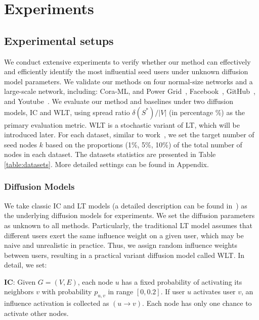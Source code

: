 \section{Experiments}
\label{sec:experiments}



\subsection{Experimental setups}
We conduct extensive experiments to verify whether our method can effectively and efficiently identify the most influential seed users under unknown diffusion model parameters.
We validate our methods on 
four normal-size networks and a large-scale network, including:
Cora-ML, and Power Grid~\cite{ling2023icml}, 
Facebook~\cite{AAAI2015_nr_data},
GitHub~\cite{rozemberczki2019multiscale},
and Youtube~\cite{yang2012defining}.
We evaluate our method and baselines under two diffusion models, IC and WLT, using spread ratio $\delta(S^{*})/|V|$ (in percentage \%) as the primary evaluation metric. 
WLT is a stochastic variant of LT, which will be introduced later.
For each dataset, similar to work~\cite{ling2023icml, hevapathige2024_DeepSN}, we set the target number of seed nodes $k$ based on the proportions (1\%, 5\%, 10\%) of the total number of nodes in each dataset.
The datasets statistics are presented in Table \ref{table:datasets}.
More detailed settings can be found in Appendix.


\subsubsection{Diffusion Models}
We take classic IC and LT models (a detailed description can be found in~\cite{kempe2003im, li2022piano}) as the underlying diffusion models for experiments.
We set the diffusion parameters as unknown to all methods.
Particularly, the traditional LT model assumes that different users exert the same influence weight on a given user, which may be naive and unrealistic in practice.
Thus, we assign random influence weights between users, resulting in a practical variant diffusion model called WLT.
In detail, we set:

\textbf{IC}: Given $G=(V,E)$, each node $u$ has a fixed probability of activating its neighbors $v$ with probability $p_{u,v}$ in range $[0, 0.2]$. If user $u$ activates user $v$, an influence activation is collected as $(u \rightarrow v)$. Each node has only one chance to activate other nodes.

